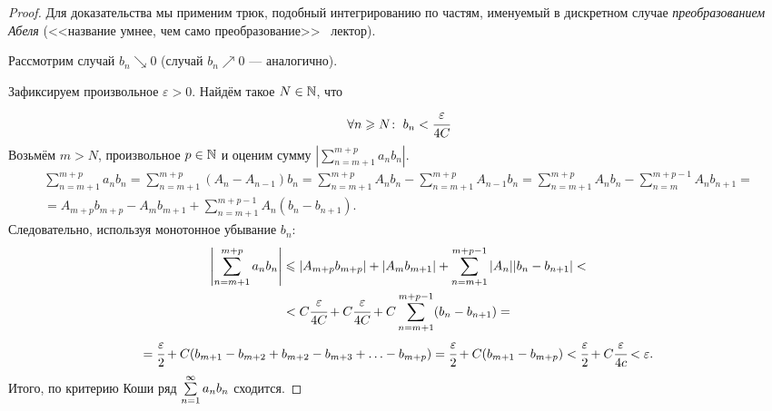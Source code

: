 \documentclass[a4paper, 12pt]{article}
\begin{document}
\begin{proof}
	Для доказательства мы применим трюк, подобный интегрированию по частям, именуемый в дискретном случае \textit{преобразованием Абеля} (<<название умнее, чем само преобразование>> \textcopyright\ лектор).
	
	Рассмотрим случай $b_n \searrow 0$ (случай $b_n \nearrow 0$ --- аналогично).
	
	Зафиксируем произвольное $\varepsilon>0$. Найдём такое $N \in \mathbb{N}$, что 
	$$
		\forall n\geqslant N\colon\; b_n < \cfrac{\varepsilon}{4C}
	$$
	Возьмём $m>N$, произвольное $p\in \mathbb{N}$ и оценим сумму $\left|\sum\limits_{n=m + 1}^{m+p}a_n b_n\right|$.
	\begin{gather*}
		\sum\limits_{n=m+1}^{m+p} a_n b_n = \sum\limits_{n=m+1}^{m+p}\left(A_n - A_{n-1}\right)b_n = \sum\limits_{n=m+1}^{m+p} A_nb_n - \sum\limits_{n=m+1}^{m+p} A_{n-1} b_n = \sum\limits_{n=m+1}^{m+p}A_nb_n - \sum\limits_{n=m}^{m+p - 1}A_nb_{n+1} = \\
		= A_{m+p} b_{m+p} - A_mb_{m+1} + \sum\limits_{n=m+1}^{m+p - 1}A_n\left(b_n-b_{n+1}\right).
	\end{gather*}
	Следовательно, используя монотонное убывание $b_n$:
	\begin{gather*}
		\left|\sum\limits_{n=m+1}^{m+p} a_n b_n\right| \leqslant |A_{m+p}b_{m+p}| + |A_mb_{m+1}| + 		\sum\limits_{n=m+1}^{m+p-1} |A_n||b_n - b_{n+1}| <\\ < C\cfrac{\varepsilon}{4C} + C \cfrac{\varepsilon}{4C} + C 	\sum\limits_{n=m+1}^{m+p-1}( b_n - b_{n+1}) =\\= \cfrac{\varepsilon}{2} + C(b_{m+1} -b_{m+2} + b_{m + 2} - b_{m+3} + \ldots -b_{m+p}) = \cfrac{\varepsilon}{2} + C(b_{m+1} - b_{m+p}) < \cfrac{\varepsilon}{2} + C\cfrac{\varepsilon}{4c} < \varepsilon.
	\end{gather*}
	Итого, по критерию Коши ряд $\sum\limits_{n=1}^{\infty}a_nb_n$ сходится.
\end{proof}
\end{document}
